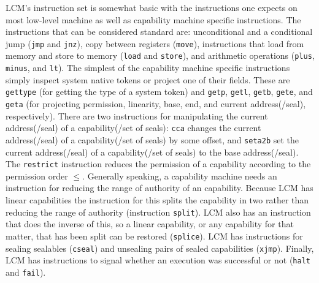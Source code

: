 \documentclass[acmsmall,review,anonymous]{acmart}\settopmatter{printfolios=true,printccs=false,printacmref=false}
\newcommand{\trgcm}{\textsc{LCM}}
\begin{document}
\trgcm{}'s instruction set is somewhat basic with the instructions one expects on most low-level machine as well as capability machine specific instructions.
The instructions that can be considered standard are: unconditional and a conditional jump (\texttt{jmp} and \texttt{jnz}), copy between registers (\texttt{move}), instructions that load from memory and store to memory (\texttt{load} and \texttt{store}), and arithmetic operations (\texttt{plus}, \texttt{minus}, and \texttt{lt}).
The simplest of the capability machine specific instructions simply inspect system native tokens or project one of their fields.
These are \texttt{gettype} (for getting the type of a system token) and \texttt{getp}, \texttt{getl}, \texttt{getb}, \texttt{gete}, and \texttt{geta} (for projecting permission, linearity, base, end, and current address(/seal), respectively).
There are two instructions for manipulating the current address(/seal) of a capability(/set of seals): \texttt{cca} changes the current address(/seal) of a capability(/set of seals) by some offset, and \texttt{seta2b} set the current address(/seal) of a capability(/set of seals) to the base address(/seal).
The \texttt{restrict} instruction reduces the permission of a capability according to the permission order $\le$.
Generally speaking, a capability machine needs an instruction for reducing the range of authority of an capability.
Because \trgcm{} has linear capabilities the instruction for this splits the capability in two rather than reducing the range of authority (instruction \texttt{split}).
\trgcm{} also has an instruction that does the inverse of this, so a linear capability, or any capability for that matter, that has been split can be restored (\texttt{splice}).
\trgcm{} has instructions for sealing sealables (\texttt{cseal}) and unsealing pairs of sealed capabilities (\texttt{xjmp}).
Finally, \trgcm{} has instructions to signal whether an execution was successful or not (\texttt{halt} and \texttt{fail}).
\end{document}
